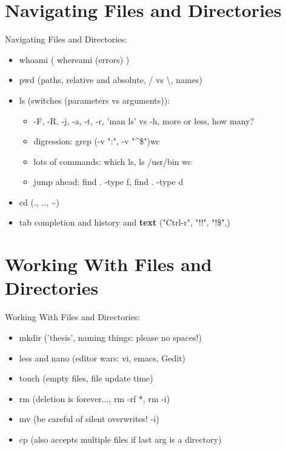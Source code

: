 \documentclass[
 size=12pt,
 paper=screen,
 mode=present,
 display=slidesnotes,
 style=paintings,
 nohandoutpagebreaks,
]{powerdot}
\begin{document}
\section[slide=false]{Navigating Files and Directories}

\begin{slide}{Navigating Files and Directories:}
  \begin{itemize}
     \item whoami ( whereami (errors) )
     \item pwd (paths, relative and absolute, / vs \textbackslash, names)
     \item ls (switches (parameters vs arguments)):
        \begin{itemize}
           \item -F, -R, -j, -a, -t, -r, 'man ls' vs -h, \textbar more or less, how many?
           \item digression: grep (-v ":", -v "\textasciicircum\$")\textbar wc
           \item lots of commands: which ls, ls /usr/bin \textbar wc
           \item jump ahead: find . -type f, find . -type d
        \end{itemize}
     \item cd (., .., \textasciitilde)
     \item tab completion and history and \textbf{text} ("Ctrl-r", "!!", "!\$",)
  \end{itemize}
\end{slide}

\section[slide=false]{Working With Files and Directories}

\begin{slide}{Working With Files and Directories:}
  \begin{itemize}
     \item mkdir ('thesis', naming things: please no spaces!)
     \item less and nano (editor wars: vi, emacs, Gedit)
     \item touch (empty files, file update time)
     \item rm (deletion is forever..., rm -rf *, rm -i)
     \item mv (be careful of silent overwrites! -i)
     \item cp (also accepts multiple files if last arg is a directory)
  \end{itemize}
\end{slide}
\end{document}
